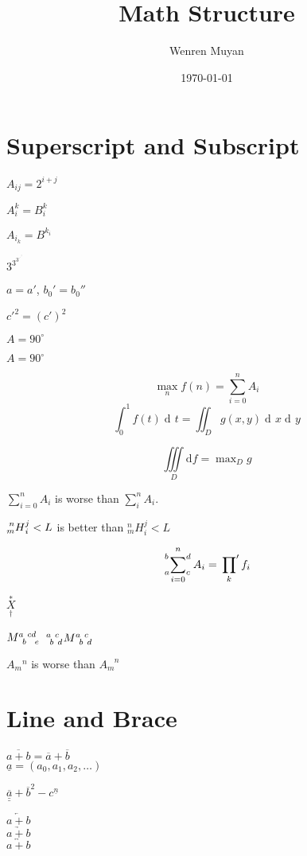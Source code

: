 \documentclass{article}
\title{Math Structure}
\author{Wenren Muyan}
\date{\today}
\DeclareMathOperator\dif{d\!}
\newcommand\degree{^\circ}
\begin{document}
    \maketitle
    \tableofcontents

    \section{Superscript and Subscript}
        $A_{ij}=2^{i+j}$

        $A_i^k = B^k_i$\par
        $A_{i_k} = B^{k_i}$\par
        $3^{3^{3^{\cdot^{\cdot^{\cdot^3}}}}}$

        $a = a'$, $b_0' = b_0''$\par
        ${c'}^2 = (c')^2$

        $A=90^\circ$\par
        $A=90\degree$

        \[
            \max_n f(n) = \sum_{i=0}^n A_i
        \]
        \[
            \int_0^1 f(t) \dif t = 
            \iint_D g(x,y) \dif x \dif y
        \]

        \[
            \iiint\limits_D \mathrm{d}f =
            \max\nolimits_D g   
        \]

        $\sum\limits_{i=0}^n A_i$ is worse than
        $\sum_i^n A_i$.

        $\prescript{n}{m}{H}_i^j < L$ is better than 
        ${}^n_mH_i^j < L$

        \[
            \sideset{_a^b}{_c^d} \sum_{i=0}^n A_i = 
            \sideset{}{'} \prod_k f_i
        \]

        $\overset{*}{\underset{\dag}{X}}$

        $M\indices{^a_b^{cd}_e}$ \qquad
        $\tensor[^a_b^c_d]{M}{^a_b^c_d}$

        $A_m{}^n$ is worse than $A_m^{\phantom{m}n}$

        \section{Line and Brace}

        $\overline{a+b} =
         \overline a + \overline b$\\
        $\underline a = (a_0,a_1,a_2,\dots)$

        $\overline{\underline{\underline a}} +
        \overline{b}^2 - c^{\underline n}$

        $\overleftarrow{a+b}$\\
        $\underrightarrow{a+b}$\\
        $\overleftrightarrow{a+b}$
\end{document}
